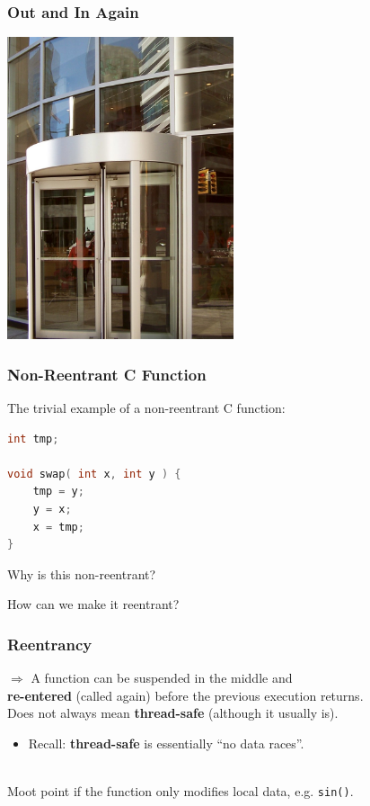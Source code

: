\begin{frame}
\frametitle{Out and In Again}

\begin{center}
	\includegraphics[width=0.5\textwidth]{images/revolvingdoor.jpg}
\end{center}

\end{frame}


\begin{frame}[fragile]
\frametitle{Non-Reentrant C Function}

The trivial example of a non-reentrant C function:

\begin{lstlisting}[language=C]
int tmp;

void swap( int x, int y ) {
    tmp = y;
    y = x;
    x = tmp;
}
\end{lstlisting}

Why is this non-reentrant?

How can we make it reentrant?

\end{frame}

\begin{frame}
  \frametitle{Reentrancy}

  
    $\Rightarrow$ A function can be suspended in the middle and \\ {\bf re-entered}
      (called again) before the previous execution returns.\\[1em]
    
     Does not always mean {\bf thread-safe} (although it usually is).
      \begin{itemize}
        \item Recall: {\bf thread-safe} is essentially ``no data races''.
      \end{itemize}
 ~\\[1em]
  Moot point if the function only modifies local data, e.g. {\tt sin()}.
  
\end{frame}

